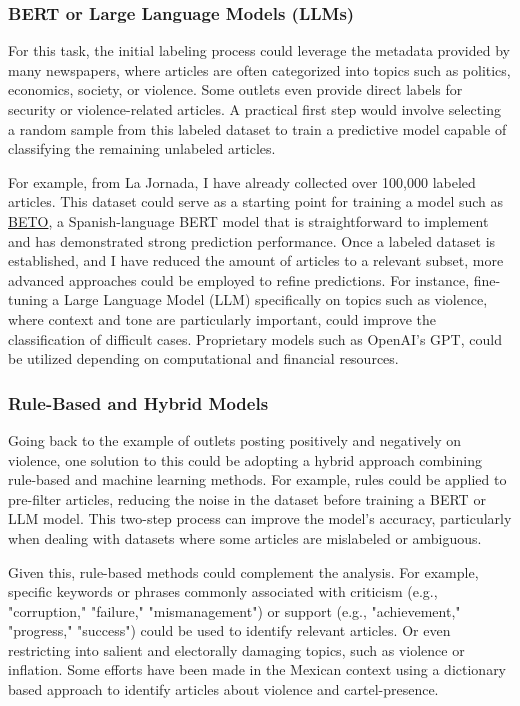\subsubsection{BERT or Large Language Models (LLMs)}

For this task, the initial labeling process could leverage the metadata provided by many newspapers, where articles are often categorized into topics such as politics, economics, society, or violence. Some outlets even provide direct labels for security or violence-related articles. A practical first step would involve selecting a random sample from this labeled dataset to train a predictive model capable of classifying the remaining unlabeled articles.

For example, from La Jornada, I have already collected over 100,000 labeled articles. This dataset could serve as a starting point for training a model such as \href{https://github.com/dccuchile/beto}{BETO}, a Spanish-language BERT model that is straightforward to implement and has demonstrated strong prediction performance. Once a labeled dataset is established, and I have reduced the amount of articles to a relevant subset, more advanced approaches could be employed to refine predictions. For instance, fine-tuning a Large Language Model (LLM) specifically on topics such as violence, where context and tone are particularly important, could improve the classification of difficult cases. Proprietary models such as OpenAI's GPT, could be utilized depending on computational and financial resources.

\subsubsection{Rule-Based and Hybrid Models}

Going back to the example of outlets posting positively and negatively on violence, one solution to this could be adopting a hybrid approach combining rule-based and machine learning methods. For example, rules could be applied to pre-filter articles, reducing the noise in the dataset before training a BERT or LLM model. This two-step process can improve the model's accuracy, particularly when dealing with datasets where some articles are mislabeled or ambiguous.

Given this, rule-based methods could complement the analysis. For example, specific keywords or phrases commonly associated with criticism (e.g., "corruption," "failure," "mismanagement") or support (e.g., "achievement," "progress," "success") could be used to identify relevant articles. Or even restricting into salient and electorally damaging topics, such as violence or inflation. Some efforts have been made in the Mexican context using a dictionary based approach \citep{SobrinoCartel, Marshall} to identify articles about violence and cartel-presence.

